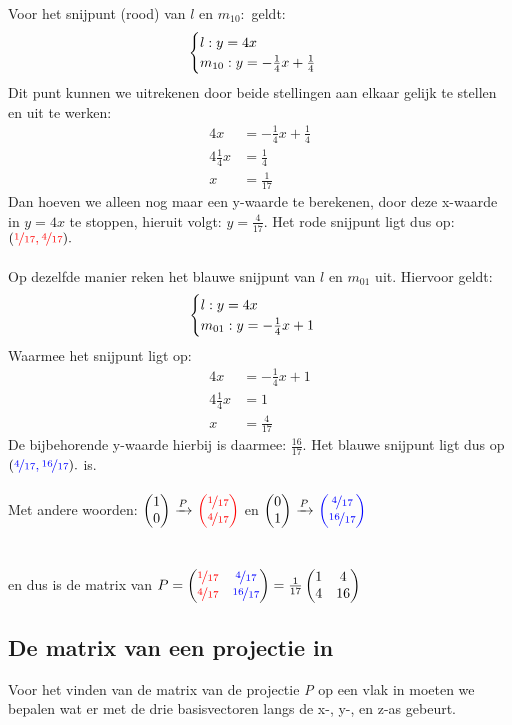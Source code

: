Voor het snijpunt (rood) van  $l$ en $ m_{10}: $ geldt:
\[\begin{cases}
$$ l: y = 4x   \\
m_{10}: y = - \frac{1}{4}x + \frac{1}{4} $$
\end{cases}
\] 
Dit punt kunnen we uitrekenen door beide stellingen aan elkaar gelijk te stellen en uit te werken: \\
\begin{align*}
    4x &= - \frac{1}{4}x + \frac{1}{4} \\
    4\frac{1}{4}x &= \frac{1}{4} \\
    x &= \frac{1}{17}
\end{align*}
 Dan hoeven we alleen nog maar een y-waarde te berekenen, door deze x-waarde in $y = 4x $ te stoppen, hieruit volgt: $  y = \frac{4}{17}.  $ Het rode snijpunt ligt dus op: $ ({\color{red}\nicefrac{1}{17},\nicefrac{4}{17}  } ). $ \\  \\
 Op dezelfde manier reken het blauwe snijpunt van  $l$ en $ m_{01}$ uit. Hiervoor geldt:
\[\begin{cases}
$$ l: y = 4x   \\
m_{01}: y = - \frac{1}{4}x + 1 $$
\end{cases}
\] 
Waarmee het snijpunt ligt op:
\begin{align*}
    4x &= - \frac{1}{4}x + 1 \\
    4\frac{1}{4}x &= 1 \\
    x &= \frac{4}{17}
\end{align*}
De bijbehorende y-waarde hierbij is daarmee: $\frac{16}{17}$. Het blauwe snijpunt ligt dus op $ ({\color{blue}\nicefrac{4}{17},\nicefrac{16}{17}  } ). $ is. 
\\ \\Met andere woorden:
$ \vectwee{1}{0}   \  \xrightarrow{P}  \ \vectwee[red]{ \nicefrac{1} {17}} {\nicefrac {4} {17}} $  \quad en  \quad 
$ \vectwee{0}{1}   \  \xrightarrow{P}  \  \vectwee[blue]{\nicefrac{4}{17} } {\nicefrac{16}{17}} $ \\ \\ \\
en dus is de matrix van 
$ P = \begin{pmatrix} {\color{red}\nicefrac{1}{17}}&{\color{blue}\nicefrac{4}{17}} \\ {\color{red}\nicefrac{4}{17}}&{\color{blue}\nicefrac{16}{17}} \end{pmatrix} 
= \frac{1}{17}\begin{pmatrix} 1&4 \\ 4&16 \end{pmatrix}$\\

\newpage
\subsection{De matrix van een projectie in \RD}\label{projectieR3}
Voor het vinden van de matrix van de projectie \textit{P} op een vlak in \RD moeten we bepalen wat er met de drie basisvectoren langs de x-, y-, en z-as  gebeurt.


